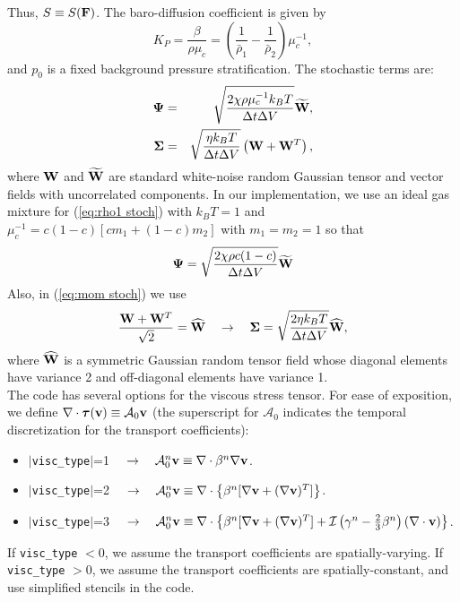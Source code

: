 \documentclass[final]{siamltex}
\def\Fb {{\bf F}}
\def\vb {{\bf v}}
\def\Wb {{\bf W}}
\def\Psib   {\boldsymbol{\Psi}}
\def\Sigmab {\boldsymbol{\Sigma}}
\def\taub   {\boldsymbol{\tau}}
\begin{document}
Thus, $S \equiv S(\Fb)$.  The baro-diffusion coefficient is given by
\begin{equation}
K_P = \frac{\beta}{\rho\mu_c} = \left(\frac{1}{\bar\rho_1}-\frac{1}{\bar\rho_2}\right)\mu_c^{-1},
\end{equation}
and $p_0$ is a fixed background pressure stratification.  The stochastic terms are:
\begin{eqnarray}
\Psib &=& \sqrt{\frac{2\chi\rho\mu_c^{-1}k_BT}{\Delta t\Delta V}}\widetilde\Wb,\label{eq:rho1 stoch}\\
\Sigmab &=& \sqrt{\frac{\eta k_B T}{\Delta t\Delta V}}\left(\Wb + \Wb^T\right),\label{eq:mom stoch}
\end{eqnarray}
where $\Wb$ and $\widetilde\Wb$ are standard white-noise random Gaussian tensor
and vector fields with uncorrelated components.  In our implementation, 
we use an ideal gas mixture for (\ref{eq:rho1 stoch}) with 
$k_BT=1$ and $\mu_c^{-1}=c(1-c)[cm_1+(1-c)m_2]$ with $m_1=m_2=1$ so that
\begin{equation}
\Psib = \sqrt{\frac{2\chi\rho c(1-c)}{\Delta t\Delta V}}\widetilde\Wb
\end{equation}
Also, in (\ref{eq:mom stoch}) we use
\begin{equation}
\frac{\Wb + \Wb^T}{\sqrt{2}} = \widehat\Wb \quad \rightarrow \quad
\Sigmab = \sqrt{\frac{2\eta k_B T}{\Delta t\Delta V}}\widehat\Wb,
\end{equation}
where $\widehat\Wb$ is a symmetric Gaussian random tensor field whose diagonal elements
have variance 2 and off-diagonal elements have variance 1.\\

The code has several options for the viscous stress tensor.  For ease of exposition,
we define $\nabla\cdot\taub(\vb)\equiv\mathcal{A}_0\vb$ (the superscript
for $\mathcal{A}_0$ indicates the temporal discretization for the transport coefficients):\\
\begin{itemize}
\item $|${\tt visc\_type}$|$=1 $\quad\rightarrow\quad \mathcal{A}_0^n\vb \equiv \nabla\cdot\beta^n\nabla\vb$.\\
\item $|${\tt visc\_type}$|$=2 $\quad\rightarrow\quad \mathcal{A}_0^n\vb \equiv \nabla\cdot\left\{\beta^n[\nabla\vb + (\nabla\vb)^T]\right\}$.\\
\item $|${\tt visc\_type}$|$=3 $\quad\rightarrow\quad \mathcal{A}_0^n\vb \equiv \nabla\cdot\left\{\beta^n[\nabla\vb + (\nabla\vb)^T] + \mathcal{I}\left(\gamma^n - \frac{2}{3}\beta^n\right)(\nabla\cdot\vb)\right\}$.\\
\end{itemize}
If {\tt visc\_type} $<0$, we assume the transport coefficients are spatially-varying.
If {\tt visc\_type} $>0$, we assume the transport coefficients are spatially-constant, and use simplified stencils
in the code.
\end{document}
